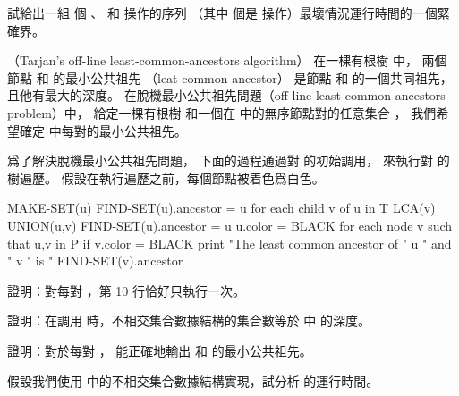 \startigBase[continue]\startitem
試給出一組  個 、  和  操作的序列
（其中  個是  操作）最壞情況運行時間的一個緊確界。
\stopitem\stopigBase

\startANSWER
{}
\stopANSWER

\stopPROBLEM

\startPROBLEM
（Tarjan’s off-line least-common-ancestors algorithm）
在一棵有根樹  中，
兩個節點  和  的{\EMP 最小公共祖先}
（leat common ancestor） \m{\omega} 是節點  和  的一個共同祖先，
且他有最大的深度。
在{\EMP 脫機最小公共祖先問題}（off-line least-common-ancestors problem）中，
給定一棵有根樹  和一個在  中的無序節點對的任意集合  ，
我們希望確定  中每對的最小公共祖先。

爲了解決脫機最小公共祖先問題，
下面的過程通過對  的初始調用，
來執行對  的樹遍歷。
假設在執行遍歷之前，每個節點被着色爲白色。

\startCLRS
MAKE-SET(u)
FIND-SET(u).ancestor = u
for each child v of u in T
	LCA(v)
	UNION(u,v)
	FIND-SET(u).ancestor = u
u.color = BLACK
for each node v such that {u,v} in P
	if v.color = BLACK
		print "The least common ancestor of "
			u " and " v " is " FIND-SET(v).ancestor
\stopCLRS

\startigBase[a]\startitem
證明：對每對 ，第 10 行恰好只執行一次。
\stopitem\stopigBase

\startANSWER
{}
\stopANSWER

\startigBase[continue]\startitem
證明：在調用  時，不相交集合數據結構的集合數等於  中  的深度。
\stopitem\stopigBase

\startANSWER
{}
\stopANSWER

\startigBase[continue]\startitem
證明：對於每對 ，  能正確地輸出  和  的最小公共祖先。
\stopitem\stopigBase

\startANSWER
{}
\stopANSWER

\startigBase[continue]\startitem
假設我們使用 中的不相交集合數據結構實現，試分析  的運行時間。
\stopitem\stopigBase

\startANSWER
{}
\stopANSWER

\stopPROBLEM

\stopsubject%
